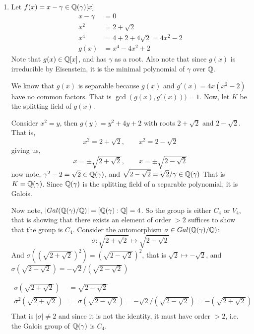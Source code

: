 \documentclass[12pt]{article}
\begin{document}
\begin{solution}
    \bbni 

    \begin{enumerate}
        \item [(a)] Let $f(x) = x - \gamma  \in \mathbb Q(\gamma)[x]$
        \begin{align*}
            x - \gamma &= 0 \\ 
            x^2 &= 2 + \sqrt2 \\ 
            x^4 &= 4 + 2 + 4\sqrt{2} = 4x^2 - 2 \\ 
            g(x) &= x^4 - 4x^2 + 2
        \end{align*}
        Note that $g(x) \in \mathbb Q[x]$, and has $\gamma$ as a root. Also note that since $g(x)$ is irreducible by Eisenstein, it is the minimal polynomial of $\gamma$ over $\mathbb Q$. 

        We know that $g(x)$ is separable because $g(x)$ and $g'(x) = 4x(x^2 -2)$ have no common factors. That is $\gcd(g(x), g'(x))) = 1$. Now, let $K$ be the splitting field of $g(x)$. 

        Consider $x^2 = y$, then $g(y) = y^2 + 4y + 2$ with roots $2 + \sqrt{2}$ and $2 - \sqrt{2}$. That is, 
        \[x^2 = 2 + \sqrt{2}, \qquad x^2 = 2 - \sqrt{2}\] 
        giving us, 
        \[x = \pm \sqrt{2 + \sqrt{2}}, \qquad x = \pm \sqrt{2 - \sqrt{2}}\]
        now note, $\gamma^2 - 2 = \sqrt{2} \in \mathbb Q(\gamma)$, and $\sqrt{2 - \sqrt{2}} = \sqrt2 / \gamma \in \mathbb Q(\gamma)$ That is $K = \mathbb Q(\gamma)$. Since $\mathbb Q(\gamma)$ is the splitting field of a separable polynomial, it is Galois. 
        
        Now note, $|Gal(\mathbb Q(\gamma)/\mathbb Q)| = [\mathbb Q(\gamma):\mathbb Q] = 4$. So the group is either $C_4$ or $V_4$, that is showing that there exists an element of order $> 2$ suffices to show that the group is $C_4$. Consider the automorphism $\sigma \in Gal(\mathbb Q(\gamma)/\mathbb Q)$: 
        \[\sigma: \sqrt{2 + \sqrt{2}} \mapsto \sqrt{2 - \sqrt{2}}\]
        And $\sigma((\sqrt{2 + \sqrt{2}})^2) = (\sqrt{2 - \sqrt{2}})^2$, that is $\sqrt{2} \mapsto -\sqrt{2}$, and $\sigma(\sqrt{2 - \sqrt{2}}) = -\sqrt{2} / (\sqrt{2 - \sqrt{2}})$

        \begin{align*}
            \sigma (\sqrt{2 + \sqrt{2}}) &= \sqrt{2 - \sqrt{2}} \\ 
            \sigma ^2 (\sqrt{2 + \sqrt{2}}) &= \sigma(\sqrt{2 - \sqrt{2}}) = -\sqrt{2} / (\sqrt{2 - \sqrt{2}})  = - (\sqrt{2 + \sqrt{2}})\\ 
        \end{align*}
        That is $|\sigma| \neq 2$ and since it is not the identity, it must have order $> 2$, i.e. the Galois group of $\mathbb Q(\gamma)$ is $C_4$.


\end{enumerate}
\end{solution}
\end{document}
